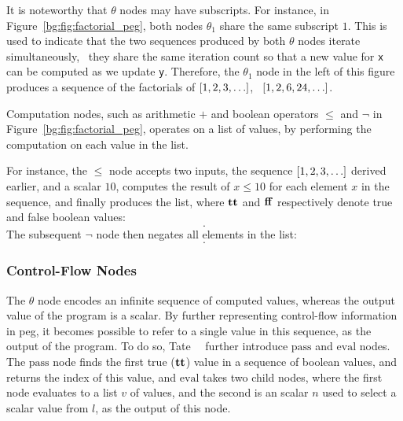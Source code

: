 It is noteworthy that $\theta$ nodes may have subscripts.  For instance,
in Figure~\ref{bg:fig:factorial_peg}, both nodes $\theta_1$ share the same
subscript $1$.  This is used to indicate that the two sequences produced
by both $\theta$ nodes iterate simultaneously, \ie~they share the same
iteration count so that a new value for \verb|x| can be computed as we update
\verb|y|.  Therefore, the $\theta_1$ node in the left of this figure produces
a sequence of the factorials of $[1, 2, 3, \mathellipsis]$, \ie~$[1, 2, 6, 24,
\mathellipsis]$.

Computation nodes, such as arithmetic $+$ and boolean operators $\leq$ and
$\neg$ in Figure~\ref{bg:fig:factorial_peg}, operates on a list of values, by
performing the computation on each value in the list.

For instance, the $\leq$ node accepts two inputs, the sequence $[1, 2, 3,
\mathellipsis]$ derived earlier, and a scalar $10$, computes the result of $x
\leq 10$ for each element $x$ in the sequence, and finally produces the list,
where $\mathbf{tt}$ and $\mathbf{ff}$ respectively denote true and false boolean
values:
\begin{equation}
    [
        \truelit, \truelit, \truelit, \truelit, \truelit,
        \truelit, \truelit, \truelit, \truelit, \truelit,
        \falselit, \falselit, \falselit, \mathellipsis
    ].
\end{equation}
The subsequent $\neg$ node then negates all elements in the list:
\begin{equation}
    [
        \falselit, \falselit, \falselit, \falselit, \falselit,
        \falselit, \falselit, \falselit, \falselit, \falselit,
        \truelit, \truelit, \truelit, \mathellipsis
    ].
    \label{bg:eq:bool_seq}
\end{equation}

\subsubsection{Control-Flow Nodes}

The $\theta$ node encodes an infinite sequence of computed values, whereas
the output value of the program is a scalar.  By further representing
control-flow information in \gls{peg}, it becomes possible to refer to a
single value in this sequence, as the output of the program.  To do so,
Tate~\etal~\cite{tate09} further introduce $\mathrm{pass}$ and $\mathrm{eval}$
nodes.  The $\mathrm{pass}$ node finds the first true ($\mathbf{tt}$) value
in a sequence of boolean values, and returns the index of this value, and
$\mathrm{eval}$ takes two child nodes, where the first node evaluates to a list
$v$ of values, and the second is an scalar $n$ used to select a scalar value
from $l$, as the output of this node.

